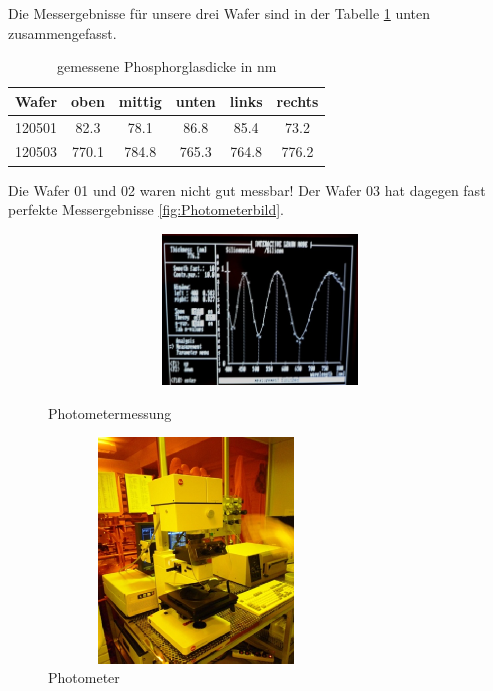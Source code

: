 Die Messergebnisse für unsere drei Wafer sind in der Tabelle \ref{tab:gemessene Phosphorglasdicke in nm} unten zusammengefasst.

\begin{table}[H]
\centering
\caption{gemessene Phosphorglasdicke in nm}
\begin{tabular}{|c|c|c|c|c|c|}

       \hline
       Wafer  & oben & mittig & unten & links & rechts \\
        \hline
       120501       & 82.3 &    78.1 &  86.8 &  85.4    & 73.2        \\
        \hline
       120503     & 770.1   & 784.8 &   765.3   & 764.8 & 776.2        \\
        \hline

\end{tabular}
\label{tab:gemessene Phosphorglasdicke in nm}
\end{table}


Die Wafer 01 und 02 waren nicht gut messbar! Der Wafer 03  hat dagegen fast perfekte Messergebnisse \ref{fig:Photometerbild}.

\begin{figure}[H]
\centering
\begin{minipage}[hbt]{6cm}
    \centering
    \includegraphics[width=1\textwidth, height=4cm]{bilder/Photometerbild.png}
  \caption{Photometermessung}
  \label{fig:Photometerbild}
\end{minipage}
\begin{minipage}[hbt]{7cm}
    \centering
    \includegraphics[width=0.7\textwidth,height=6cm]{bilder/Photometer.png}
  \caption{Photometer}
  \label{fig:Photometer}
\end{minipage}

\end{figure}



